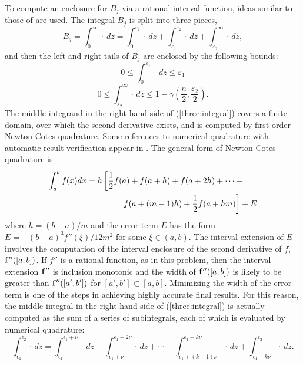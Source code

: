 \documentclass[10pt,letterpaper]{article}
\begin{document}
To compute an enclosure for $B_j$ via a rational interval function,
 ideas similar to those of
\cite{AmosBulgren} are used.  The integral $B_j$ is split into three pieces,
\begin{equation}
  B_j = \int_0^\infty \cdot \, dz = \int_0^{\varepsilon _1} \cdot \, dz 
    + \int_{\varepsilon _1}^{\varepsilon _2} \cdot \, dz 
    + \int_{\varepsilon _2}^\infty \cdot \, dz,
   \label{three:integral}
\end{equation}
and then the left and right tails of $B_j$ are enclosed by the following
bounds: 
$$
0 \leq \int_0^{\varepsilon _1} \cdot \, dz \leq \varepsilon _1 
\nonumber
$$
$$
0 \leq \int_{\varepsilon _2}^\infty \cdot \, dz 
  \leq 1 - \gamma\left(\frac{n}{2}, \frac{\varepsilon _2}{2}\right).
$$
The middle integrand in the right-hand side of 
(\ref{three:integral}) covers a finite domain, over
which the second derivative exists, and is computed by 
first-order Newton-Cotes quadrature.  Some references to numerical quadrature
with automatic result verification appear in \cite{Kelch}.  The general form
of Newton-Cotes quadrature is
\begin{eqnarray}
\lefteqn{
\int_a^b f(x) dx = h\left[\frac{1}{2}f(a) + f(a+h) + f(a+2h) + \cdots + \right.}
\hspace{3.5in} \nonumber \\
\left. f(a+(m-1)h)
+ \frac{1}{2}f(a+hm)\right] + E
\end{eqnarray}
where $h = (b-a)/m$ and the error term $E$ has the form 
$E = - (b-a)^3 f''(\xi)/12m^2$
for some $\xi \in (a,b)$.
The interval extension of $E$ involves the computation of the interval
enclosure of the second derivative of $f$,
${\bf f}''([a,b])$.  If $f''$ is a rational function, as in this problem, 
then the interval
extension ${\bf f}''$ is inclusion monotonic and the width of 
${\bf f}''([a,b])$ is likely to be greater than ${\bf f}''([a',b'])$ for
$[a',b'] \subset [a,b]$.  Minimizing the width of the error term is one
of the steps in achieving highly accurate final results.
For this reason, the middle integral in the right-hand side of
(\ref{three:integral})  is actually computed as the sum
of a series of subintegrals, each of which is evaluated by numerical
quadrature:
\begin{equation}
\int_{\epsilon _1}^{\epsilon _2} \cdot \, dz = 
  \int_{\epsilon _1}^{\epsilon _1+\nu} \cdot \, dz
 +\int_{\epsilon _1+\nu}^{\epsilon _1+2\nu} \cdot \, dz
 + \cdots + \int_{\epsilon _1+(k-1)\nu}^{\epsilon _1+k\nu} \cdot \, dz
 + \int_{\epsilon _1+k\nu}^{\epsilon _2} \cdot \, dz.
\end{equation}
\end{document}

